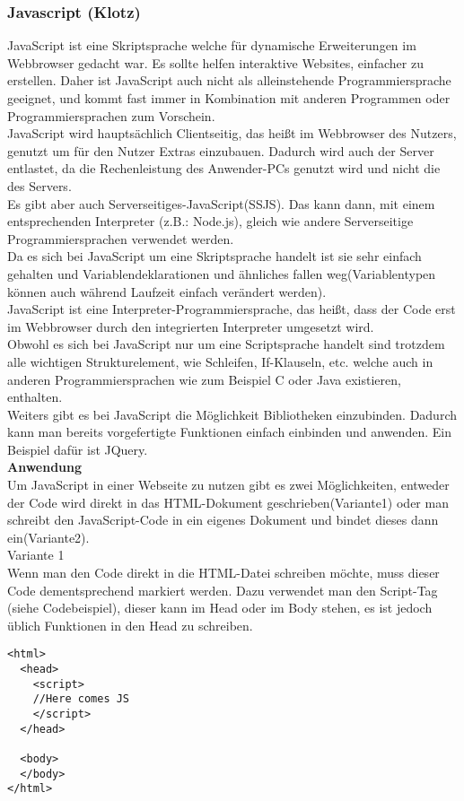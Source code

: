 \subsubsection{Javascript (Klotz)}
\label{sec:content_js_Javascript}
JavaScript ist eine Skriptsprache welche für dynamische Erweiterungen im Webbrowser gedacht war. Es sollte helfen interaktive Websites, einfacher zu erstellen. Daher ist JavaScript auch nicht als alleinstehende Programmiersprache geeignet, und kommt fast immer in Kombination mit anderen Programmen oder Programmiersprachen zum Vorschein.\\
JavaScript wird hauptsächlich Clientseitig, das heißt im Webbrowser des Nutzers, genutzt um für den Nutzer Extras einzubauen. Dadurch wird auch der Server entlastet, da die Rechenleistung des Anwender-PCs genutzt wird und nicht die des Servers.\\
 Es gibt aber auch Serverseitiges-JavaScript(SSJS). Das kann dann, mit einem entsprechenden Interpreter (z.B.: Node.js), gleich wie andere Serverseitige Programmiersprachen verwendet werden.\\
Da es sich bei JavaScript um eine Skriptsprache handelt ist sie sehr einfach gehalten und Variablendeklarationen und ähnliches fallen weg(Variablentypen können auch während Laufzeit einfach verändert werden).\\
JavaScript ist eine Interpreter-Programmiersprache, das heißt, dass der Code erst im Webbrowser durch den integrierten Interpreter umgesetzt wird.\\
Obwohl es sich bei JavaScript nur um eine Scriptsprache handelt sind trotzdem alle wichtigen Strukturelement, wie Schleifen, If-Klauseln, etc. welche auch in anderen Programmiersprachen wie zum Beispiel C oder Java existieren, enthalten.\\
Weiters gibt es bei JavaScript die Möglichkeit Bibliotheken einzubinden. Dadurch kann man bereits vorgefertigte Funktionen einfach einbinden und anwenden. Ein Beispiel dafür ist JQuery.\\

\textbf{Anwendung}\\
Um JavaScript in einer Webseite zu nutzen gibt es zwei Möglichkeiten, entweder der Code wird direkt in das HTML-Dokument geschrieben(Variante1) oder man schreibt den JavaScript-Code in ein eigenes Dokument und bindet dieses dann ein(Variante2).\\
Variante 1\\
Wenn man den Code direkt in die HTML-Datei schreiben möchte, muss dieser Code dementsprechend markiert werden. Dazu verwendet man den Script-Tag (siehe Codebeispiel), dieser kann im Head oder im Body stehen, es ist jedoch üblich Funktionen in den Head zu schreiben.\\
\begin{lstlisting}
<html>
  <head>
    <script>
	//Here comes JS
    </script> 
  </head>
  
  <body>
  </body>
</html>
\end{lstlisting}


